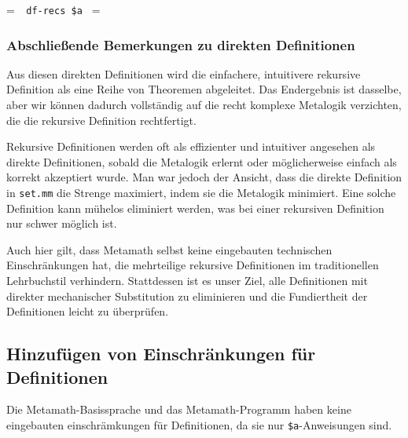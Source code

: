 \setbox\startprefix=\hbox{\tt \ \ df-recs\ \$a\ }
\setbox\contprefix=\hbox{\tt \ \ \ \ \ \ \ \ \ \ \ \ \ }
\startm
\m{\vdash}\m{(}\m{)}\m{=}\m{\bigcup}\m{\{}\m{|}\m{\exists}\m{\in}\m{(}\m{\wedge}\m{\forall}\m{\in}\m{(}\m{)}\m{=}\m{(}\m{(}\m{\restriction}\m{)}\m{)}\m{)}\m{\}}
\endm

\subsubsection{Abschließende Bemerkungen zu direkten Definitionen}

Aus diesen direkten Definitionen wird die einfachere, intuitivere rekursive Definition als eine Reihe von Theoremen abgeleitet. Das Endergebnis ist dasselbe, aber wir können dadurch vollständig auf die recht komplexe Metalogik verzichten, die die rekursive Definition rechtfertigt. 

Rekursive Definitionen werden oft als effizienter und intuitiver angesehen als direkte Definitionen, sobald die Metalogik erlernt oder möglicherweise einfach als korrekt akzeptiert wurde.  Man war jedoch der Ansicht, dass die direkte Definition in \texttt{set.mm} die Strenge maximiert, indem sie die Metalogik minimiert.  Eine solche Definition kann mühelos eliminiert werden, was bei einer rekursiven Definition nur schwer möglich ist. 

Auch hier gilt, dass Metamath selbst keine eingebauten technischen Einschränkungen hat, die mehrteilige rekursive Definitionen im traditionellen Lehrbuchstil verhindern. Stattdessen ist es unser Ziel, alle Definitionen mit direkter mechanischer Substitution zu eliminieren und die Fundiertheit der Definitionen leicht zu überprüfen. 

\subsection{Hinzufügen von Einschränkungen für Definitionen}

Die Metamath-Basissprache und das Metamath-Programm haben keine eingebauten einschrämkungen für Definitionen, da sie nur \texttt{\$a}-Anweisungen sind. 

